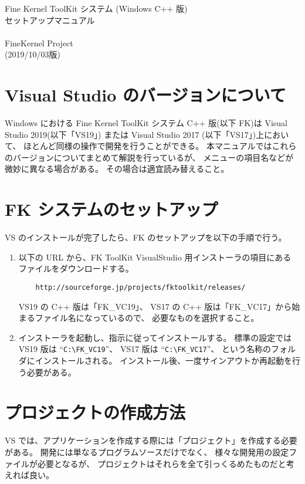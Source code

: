 \documentclass[a4paper]{jsarticle}
\begin{document}
\begin{center}
{\Large Fine Kernel ToolKit システム (Windows C++ 版) \\
	セットアップマニュアル} \\ ~ \\
{\Large FineKernel Project} \\
(2019/10/03版)
\end{center}

\section{Visual Studio のバージョンについて}
Windows における Fine Kernel ToolKit システム C++ 版(以下 FK)は 
Visual Studio 2019(以下「VS19」) または Visual Studio 2017 (以下「VS17」)上において、
ほとんど同様の操作で開発を行うことができる。
本マニュアルではこれらのバージョンについてまとめて解説を行っているが、
メニューの項目名などが微妙に異なる場合がある。
その場合は適宜読み替えること。

\section{FK システムのセットアップ}
VS のインストールが完了したら、FK のセットアップを以下の手順で行う。

\begin{enumerate}
\item 以下の URL から、FK ToolKit VisualStudio 用インストーラの項目にある
ファイルをダウンロードする。

\begin{verbatim}
    http://sourceforge.jp/projects/fktoolkit/releases/
\end{verbatim}

VS19 の C++ 版は「FK\_VC19」、
VS17 の C++ 版は「FK\_VC17」から始まるファイル名になっているので、
必要なものを選択すること。

\item インストーラを起動し、指示に従ってインストールする。
標準の設定では VS19 版は ``\verb+C:\FK_VC19+''、
VS17 版は ``\verb+C:\FK_VC17+''、 という名称のフォルダにインストールされる。
インストール後、一度サインアウトか再起動を行う必要がある。

\end{enumerate}

\section{プロジェクトの作成方法}
VS では、アプリケーションを作成する際には「プロジェクト」を作成する必要がある。
開発には単なるプログラムソースだけでなく、
様々な開発用の設定ファイルが必要となるが、
プロジェクトはそれらを全て引っくるめたものだと考えれば良い。
\end{document}
